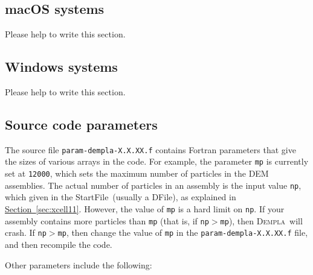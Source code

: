 \documentclass[letterpaper,11pt]{article}
\newcommand{\Dempla}{\textsc{Dempla}}
\newcommand{\StartFile}{\textsf{StartFile}}
\newcommand{\DFile}{\textsf{DFile}}
\begin{document}
\subsection{macOS systems}
Please help to write this section.
%
\subsection{Windows systems}
Please help to write this section.
%
%
\subsection{Source code parameters}\label{sec:params}
The source file \texttt{param-dempla-X.X.XX.f}
contains Fortran parameters that give the sizes
of various arrays in the code.
For example, the parameter \texttt{mp}
is currently set at \texttt{12000},
which sets the maximum number of particles in the
DEM assemblies.
The actual number of particles in an assembly
is the input value \texttt{np}, which given in
the \StartFile\ (usually a \DFile),
as explained in
\hyperref[sec:xcell11]{Section~\ref*{sec:xcell11}}.
However, the value of \texttt{mp} is a hard limit
on \texttt{np}.
If your assembly contains more particles than
\texttt{mp} (that is, if \texttt{np}$>$\texttt{mp}),
then \Dempla\ will crash.
If \texttt{np}$>$\texttt{mp}, then change the value
of \texttt{mp} in the \texttt{param-dempla-X.X.XX.f}
file, and then recompile the code.
\par
Other parameters include the following:
\end{document}
